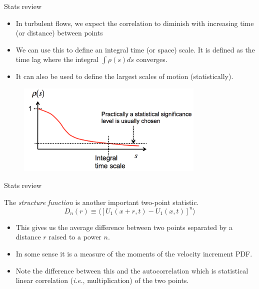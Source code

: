 
\begin{frame}{Stats review}
    \begin{itemize}
    	\item In turbulent flows, we expect the correlation to diminish with increasing time (or
distance) between points
    	\item We can use this to define an integral time (or space) scale. It is defined as the time lag where the integral $\int \rho(s)ds$ converges. 
    	\item It can also be used to define the largest scales of motion (statistically).
    \end{itemize}
  
  \begin{figure}
  \includegraphics[width=0.8\textwidth]{auto1.png}
  \end{figure}
  
\end{frame}


\begin{frame}{Stats review}
  
  The \textit{structure function} is another important two-point statistic.
  $$D_n(r) \equiv \langle [U_1(x+r,t) - U_1(x,t)]^n\rangle$$
  \begin{itemize}
  	\item This gives us the average difference between two points separated by a distance $r$ raised to a power $n$.
  	\item In some sense it is a measure of the moments of the velocity increment PDF.
  	\item Note the difference between this and the autocorrelation which is statistical linear correlation (\textit{i.e.}, multiplication) of the two points.
  \end{itemize}
  
\end{frame}

